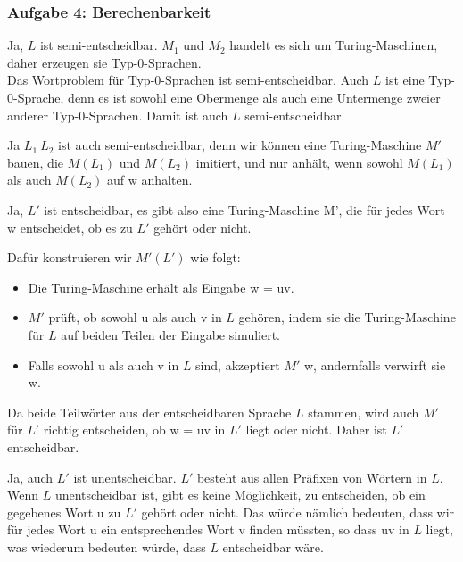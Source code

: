 \subsubsection{Aufgabe 4: Berechenbarkeit}

\begin{teile}
	\item
	Ja, $L$ ist semi-entscheidbar.
	$M_1$ und $M_2$ handelt es sich um Turing-Maschinen, daher erzeugen sie Typ-0-Sprachen. \\	
	Das Wortproblem für Typ-0-Sprachen ist semi-entscheidbar.
	Auch $L$ ist eine Typ-0-Sprache, denn es ist sowohl eine Obermenge als auch eine Untermenge zweier anderer Typ-0-Sprachen. Damit ist auch $L$ semi-entscheidbar.
	
	\item
	Ja $L_1 \ L_2$ ist auch semi-entscheidbar, denn wir können eine Turing-Maschine $M'$ bauen, die $M(L_1)$ und $M(L_2)$ imitiert, und nur anhält, wenn sowohl $M(L_1)$ als auch $M(L_2)$ auf w anhalten.
	
	\item
	Ja, $L'$ ist entscheidbar, es gibt also eine Turing-Maschine M', die für jedes Wort w entscheidet, ob es zu $L'$ gehört oder nicht.

    Dafür konstruieren wir $M'(L')$ wie folgt:
	\begin{itemize}
    	\item 
    	Die Turing-Maschine erhält als Eingabe w = uv.
    	\item $M'$ prüft, ob sowohl u als auch v in $L$ gehören, indem sie die Turing-Maschine für $L$ auf beiden Teilen der Eingabe simuliert.
    	\item Falls sowohl u als auch v in $L$ sind, akzeptiert $M'$ w, andernfalls verwirft sie w.
    \end{itemize}

    Da beide Teilwörter aus der entscheidbaren Sprache $L$ stammen, wird auch $M'$ für $L'$ richtig entscheiden, ob w = uv in $L'$ liegt oder nicht. Daher ist $L'$ entscheidbar.
    
    \item
    Ja, auch $L'$ ist unentscheidbar. $L'$ besteht aus allen Präfixen von Wörtern in $L$. Wenn $L$ unentscheidbar ist, gibt es keine Möglichkeit, zu entscheiden, ob ein gegebenes Wort u zu $L'$ gehört oder nicht. Das würde nämlich bedeuten, dass wir für jedes Wort u ein entsprechendes Wort v finden müssten, so dass uv in $L$ liegt, was wiederum bedeuten würde, dass $L$ entscheidbar wäre.
	
\end{teile}
